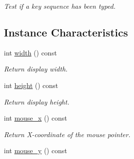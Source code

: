 \begin{DoxyCompactItemize}
\begin{DoxyCompactList}\small\item\em Test if a key sequence has been typed. \item\end{DoxyCompactList}\end{DoxyCompactItemize}
\subsection*{Instance Characteristics}
\label{_amgrp793b2d5051efe1cb9227216131875e3a}
 \begin{DoxyCompactItemize}
\item 
\hypertarget{structcimg__library_1_1CImgDisplay_a369399896761e31ae71db57fdd0ba431}{
int \hyperlink{structcimg__library_1_1CImgDisplay_a369399896761e31ae71db57fdd0ba431}{width} () const }
\label{structcimg__library_1_1CImgDisplay_a369399896761e31ae71db57fdd0ba431}

\begin{DoxyCompactList}\small\item\em Return display width. \item\end{DoxyCompactList}\item 
\hypertarget{structcimg__library_1_1CImgDisplay_ae26bcfe2f33f5873dbdfb6948cf1f59f}{
int \hyperlink{structcimg__library_1_1CImgDisplay_ae26bcfe2f33f5873dbdfb6948cf1f59f}{height} () const }
\label{structcimg__library_1_1CImgDisplay_ae26bcfe2f33f5873dbdfb6948cf1f59f}

\begin{DoxyCompactList}\small\item\em Return display height. \item\end{DoxyCompactList}\item 
\hypertarget{structcimg__library_1_1CImgDisplay_ae60918cd2b0b4c6588b2d10aea46a22c}{
int \hyperlink{structcimg__library_1_1CImgDisplay_ae60918cd2b0b4c6588b2d10aea46a22c}{mouse\_\-x} () const }
\label{structcimg__library_1_1CImgDisplay_ae60918cd2b0b4c6588b2d10aea46a22c}

\begin{DoxyCompactList}\small\item\em Return X-\/coordinate of the mouse pointer. \item\end{DoxyCompactList}\item 
\hypertarget{structcimg__library_1_1CImgDisplay_a628a43671de755c52d67ad01a019292b}{
int \hyperlink{structcimg__library_1_1CImgDisplay_a628a43671de755c52d67ad01a019292b}{mouse\_\-y} () const }
\label{structcimg__library_1_1CImgDisplay_a628a43671de755c52d67ad01a019292b}


\end{DoxyCompactItemize}
